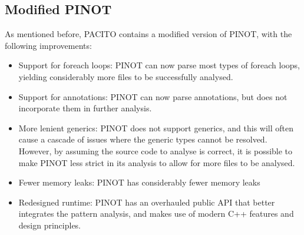 \subsection{Modified PINOT}
As mentioned before, PACITO contains a modified version of PINOT, with the following improvements:
\begin{itemize}
    \item Support for foreach loops: PINOT can now parse most types of foreach loops, yielding considerably more files to be successfully analysed.
    \item Support for annotations: PINOT can now parse annotations, but does not incorporate them in further analysis.
    \item More lenient generics: PINOT does not support generics, and this will often cause a cascade of issues where the generic types cannot be resolved. However, by assuming the source code to analyse is correct, it is possible to make PINOT less strict in its analysis to allow for more files to be analysed.
    \item Fewer memory leaks: PINOT has considerably fewer memory leaks
    \item Redesigned runtime: PINOT has an overhauled public API that better integrates the pattern analysis, and makes use of modern C++ features and design principles.
\end{itemize}

